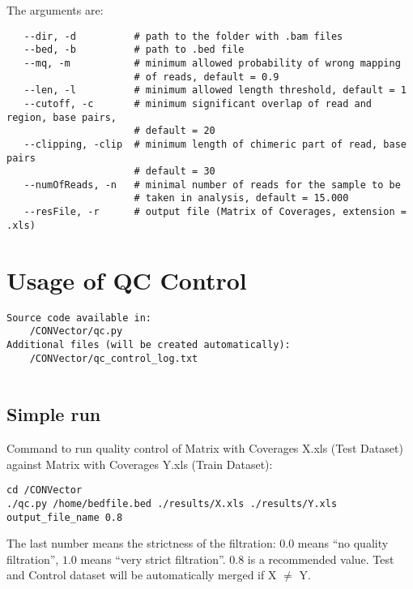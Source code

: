 \documentclass{article}
\begin{document}
The arguments are:

\begin{verbatim}
   --dir, -d          # path to the folder with .bam files
   --bed, -b          # path to .bed file
   --mq, -m           # minimum allowed probability of wrong mapping
                      # of reads, default = 0.9
   --len, -l          # minimum allowed length threshold, default = 1
   --cutoff, -c       # minimum significant overlap of read and region, base pairs, 
                      # default = 20
   --clipping, -clip  # minimum length of chimeric part of read, base pairs
                      # default = 30
   --numOfReads, -n   # minimal number of reads for the sample to be 
                      # taken in analysis, default = 15.000
   --resFile, -r      # output file (Matrix of Coverages, extension = .xls)

\end{verbatim}








\newpage
\section{Usage of QC Control}

\begin{verbatim}
Source code available in:
    /CONVector/qc.py
Additional files (will be created automatically):
    /CONVector/qc_control_log.txt
    
\end{verbatim}





\subsection{Simple run}

\hypertarget{averageRobustVariance}{Command to run quality control of Matrix with Coverages X.xls (Test Dataset) against Matrix with Coverages Y.xls (Train Dataset): }

\begin{lstlisting}[style=DOS, caption={Simple run of the QC control}]
cd /CONVector
./qc.py /home/bedfile.bed ./results/X.xls ./results/Y.xls output_file_name 0.8
\end{lstlisting}

The last number means the strictness of the filtration: $0.0$ means ``no quality filtration'', $1.0$ means ``very strict filtration''. $0.8$ is a recommended value. Test and Control dataset will be automatically merged if X $\neq$ Y.
\end{document}
